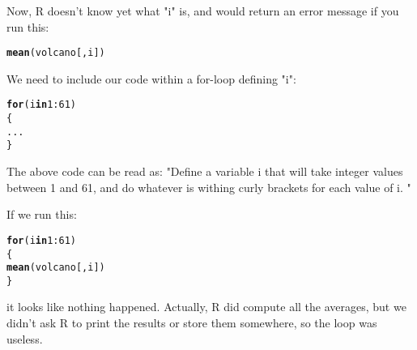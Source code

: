 \documentclass[12pt,a4paper]{scrartcl}\usepackage[]{graphicx}\usepackage[]{color}
\makeatletter
\newcommand{\hlnum}[1]{\textcolor[rgb]{0.686,0.059,0.569}{#1}}%
\newcommand{\hlopt}[1]{\textcolor[rgb]{0,0,0}{#1}}%
\newcommand{\hlstd}[1]{\textcolor[rgb]{0.345,0.345,0.345}{#1}}%
\newcommand{\hlkwa}[1]{\textcolor[rgb]{0.161,0.373,0.58}{\textbf{#1}}}%
\newcommand{\hlkwd}[1]{\textcolor[rgb]{0.737,0.353,0.396}{\textbf{#1}}}%
\newenvironment{kframe}{%
 \def\at@end@of@kframe{}%
 \ifinner\ifhmode%
  \def\at@end@of@kframe{\end{minipage}}%
  \begin{minipage}{\columnwidth}%
 \fi\fi%
 \def\FrameCommand##1{\hskip\@totalleftmargin \hskip-\fboxsep
 \colorbox{shadecolor}{##1}\hskip-\fboxsep
     \hskip-\linewidth \hskip-\@totalleftmargin \hskip\columnwidth}%
 \MakeFramed {\advance\hsize-\width
   \@totalleftmargin\z@ \linewidth\hsize
   \@setminipage}}%
 {\par\unskip\endMakeFramed%
 \at@end@of@kframe}
\newenvironment{knitrout}{}{} %
\makeatother
\begin{document}
Now, R doesn't know yet what "i" is, and would return an error message if you run this:

\begin{knitrout}
\color{fgcolor}\begin{kframe}
\begin{alltt}
\hlkwd{mean}\hlstd{( volcano[,i] )}
\end{alltt}


{\ttfamily\noindent\bfseries\color{errorcolor}{\#\# Error in mean(volcano[, i]): object 'i' not found}}\end{kframe}
\end{knitrout}

We need to include our code within a for-loop defining "i":

\begin{knitrout}
\color{fgcolor}\begin{kframe}
\begin{alltt}
\hlkwa{for} \hlstd{(i} \hlkwa{in} \hlnum{1}\hlopt{:}\hlnum{61}\hlstd{)}
\hlstd{\{}
  \hlstd{...}
\hlstd{\}}
\end{alltt}
\end{kframe}
\end{knitrout}

The above code can be read as: "Define a variable i that will take integer values between 1 and 61, and do whatever is withing curly brackets for each value of i. "

If we run this:
\begin{knitrout}
\color{fgcolor}\begin{kframe}
\begin{alltt}
\hlkwa{for} \hlstd{(i} \hlkwa{in} \hlnum{1}\hlopt{:}\hlnum{61}\hlstd{)}
\hlstd{\{}
  \hlkwd{mean}\hlstd{( volcano[,i] )}
\hlstd{\}}
\end{alltt}
\end{kframe}
\end{knitrout}
it looks like nothing happened. Actually, R did compute all the averages, but we didn't ask R to print the results or store them somewhere, so the loop was useless. 
\end{document}

